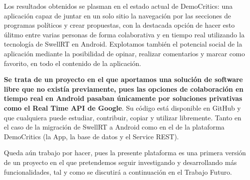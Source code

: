 Los resultados obtenidos se plasman en el estado actual de DemoCritics: una aplicación capaz de juntar en un solo sitio la navegación por las secciones de programas políticos y crear propuestas, con la destacada opción de hacer esto úlitmo entre varias personas de forma colaborativa y en tiempo real utilizando la tecnología de SwellRT en Android. Explotamos también el potencial social de la aplicación mediante la posibilidad de opinar, realizar comentarios y marcar como favorito, en todo el contenido de la aplicación.

\textbf{Se trata de un proyecto en el que aportamos una solución de software libre  que no existía previamente, pues las opciones de colaboración en tiempo real en Android pasaban únicamente por soluciones privativas como el Real Time API de Google}. Su código está disponible en GitHub y que cualquiera puede estudiar, contribuir, copiar y utilizar libremente. Tanto en el caso de la migración de SwellRT a Android como en el de la plataforma DemoCritics (la App, la base de datos y el Service REST). 

Queda aún trabajo por hacer, pues la presente plataforma es una primera versión de un proyecto en el que pretendemos seguir investigando y desarrollando más funcionalidades, tal y como se discutirá a continuación en el Trabajo Futuro. 

